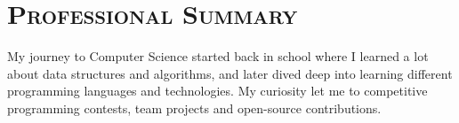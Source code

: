\vspace*{-3em}
\section{\textsc{Professional Summary}}


My journey to Computer Science started back in school where I learned a lot about data structures and algorithms, and later dived deep into learning different programming languages and technologies. My curiosity let me to competitive programming contests, team projects and open-source contributions. \\
